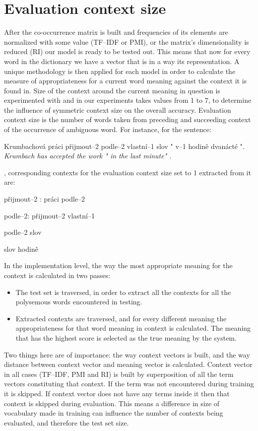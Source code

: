 \section{Evaluation context size} 
After the co-occurrence matrix is built and frequencies of its elements are normalized with some 
value (TF--IDF or PMI), or the matrix's dimensionality is reduced (RI) our model is ready to be tested out.
This means that now for every word in the dictionary we have a vector that is in a way its representation.
A unique methodology is then applied for each model in order to calculate the measure of appropriateness for a current word meaning against the context it is found in. Size of the context around the current meaning in question is experimented with and in our experiments takes values from 1 to 7, to determine the influence of symmetric context size on the overall accuracy. 
Evaluation context size is the number of words taken from preceding and succeeding context of the 
occurrence of ambiguous word. For instance, for the sentence:
\begin{examples}
\item Krumbachov\'a pr\'aci p\v{r}ijmout--2 podle--2 vlastn\'i--1 slov " v--1 hodin\^e dvan\'act\'e ".
\glt \textit{ Krumbach has accepted the work " in the last minute"  .}
\end{examples}
, corresponding contexts for the evaluation context size set to 1 extracted from it are:
\begin{examples}
\item p\v{r}ijmout--2 : pr\'aci  podle--2
\item  podle--2: p\v{r}ijmout--2 vlastn\'i--1
\item podle--2 slov
\item slov  hodin\^e
\end{examples}


In the implementation level, the way the most appropriate meaning for the context is calculated in two passes:
\begin{itemize}
\item The test set is traversed, in order to extract all the contexts for all the polysemous words 
encountered  in testing.
\item Extracted contexts are traversed, and for every different meaning the appropriateness for that 
word meaning in context is calculated. The meaning that has the highest score is selected as the 
true meaning by the system.
\end{itemize}  
Two things here are of importance: the way context vectors is built, and the way distance between context vector and meaning vector is calculated. Context vector in all cases (TF--IDF, PMI and RI) is 
built by superposition of all the term vectors constituting that context. If the term was not encountered 
during training it is skipped. If context vector does not have any terms inside it then that context is skipped during evaluation. This means a difference in size of vocabulary made in training can influence the number
of contexts being evaluated, and therefore the test set size. 

